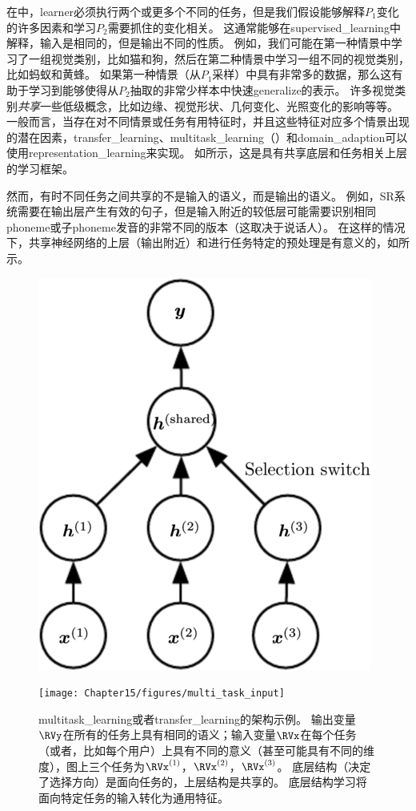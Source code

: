 在中，\gls{learner}必须执行两个或更多个不同的任务，但是我们假设能够解释$P_1$变化的许多因素和学习$P_2$需要抓住的变化相关。
这通常能够在\gls{supervised_learning}中解释，输入是相同的，但是输出不同的性质。
例如，我们可能在第一种情景中学习了一组视觉类别，比如猫和狗，然后在第二种情景中学习一组不同的视觉类别，比如蚂蚁和黄蜂。
如果第一种情景（从$P_1$采样）中具有非常多的数据，那么这有助于学习到能够使得从$P_2$抽取的非常少样本中快速\gls{generalize}的表示。%
许多视觉类别\emph{共享}一些低级概念，比如边缘、视觉形状、几何变化、光照变化的影响等等。
一般而言，当存在对不同情景或任务有用特征时，并且这些特征对应多个情景出现的潜在因素，\gls{transfer_learning}、\gls{multitask_learning}（）和\gls{domain_adaption}可以使用\gls{representation_learning}来实现。
如所示，这是具有共享底层和任务相关上层的学习框架。


然而，有时不同任务之间共享的不是输入的语义，而是输出的语义。
例如，\gls{SR}系统需要在输出层产生有效的句子，但是输入附近的较低层可能需要识别相同\gls{phoneme}或子\gls{phoneme}发音的非常不同的版本（这取决于说话人）。
在这样的情况下，共享神经网络的上层（输出附近）和进行任务特定的预处理是有意义的，如所示。



\begin{figure}[!htb]
\ifOpenSource
\centerline{\includegraphics[scale=0.5]{images/129.png}}
\else
\centerline{\texttt{[image: Chapter15/figures/multi\_task\_input]}}
\fi
\caption{\gls{multitask_learning}或者\gls{transfer_learning}的架构示例。
输出变量$\RVy$在所有的任务上具有相同的语义；输入变量$\RVx$在每个任务（或者，比如每个用户）上具有不同的意义（甚至可能具有不同的维度），图上三个任务为$\RVx^{(1)}$，$\RVx^{(2)}$，$\RVx^{(3)}$。
底层结构（决定了选择方向）是面向任务的，上层结构是共享的。
底层结构学习将面向特定任务的输入转化为通用特征。
}
\label{fig:chap15_multi_task_input}
\end{figure}

